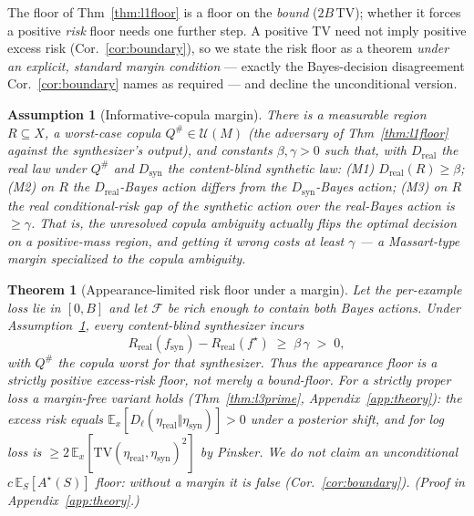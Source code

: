 \documentclass[11pt]{article}
\newtheorem{theorem}{Theorem}
\newtheorem{assumption}{Assumption}
\begin{document}
The floor of Thm~\ref{thm:l1floor} is a floor on the \emph{bound} ($2B\,\mathrm{TV}$); whether it
forces a positive \emph{risk} floor needs one further step. A positive TV need not imply positive
excess risk (Cor.~\ref{cor:boundary}), so we state the risk floor as a theorem \emph{under an
explicit, standard margin condition} --- exactly the Bayes-decision disagreement
Cor.~\ref{cor:boundary} names as required --- and decline the unconditional version.

\begin{assumption}[Informative-copula margin]\label{ass:margin}
There is a measurable region $R\subseteq X$, a worst-case copula $Q^\#\in\mathcal U(M)$ (the
adversary of Thm~\ref{thm:l1floor} against the synthesizer's output), and constants
$\beta,\gamma>0$ such that, with $D_{\mathrm{real}}$ the real law under $Q^\#$ and
$D_{\mathrm{syn}}$ the content-blind synthetic law: \emph{(M1)} $D_{\mathrm{real}}(R)\ge\beta$;
\emph{(M2)} on $R$ the $D_{\mathrm{real}}$-Bayes action differs from the $D_{\mathrm{syn}}$-Bayes
action; \emph{(M3)} on $R$ the real conditional-risk gap of the synthetic action over the
real-Bayes action is $\ge\gamma$. That is, the unresolved copula ambiguity actually flips the
optimal decision on a positive-mass region, and getting it wrong costs at least $\gamma$ --- a
Massart-type margin specialized to the copula ambiguity.
\end{assumption}

\begin{theorem}[Appearance-limited risk floor under a margin]\label{thm:l3risk}
Let the per-example loss lie in $[0,B]$ and let $\mathcal F$ be rich enough to contain both Bayes
actions. Under Assumption~\ref{ass:margin}, every content-blind synthesizer incurs
\[
R_{\mathrm{real}}(f_{\mathrm{syn}})-R_{\mathrm{real}}(f^\star)\;\ge\;\beta\,\gamma\;>\;0,
\]
with $Q^\#$ the copula worst for that synthesizer. Thus the appearance floor is a strictly
positive excess-\emph{risk} floor, not merely a bound-floor. For a strictly proper loss a
margin-free variant holds (Thm~\ref{thm:l3prime}, Appendix~\ref{app:theory}): the excess risk
equals $\mathbb{E}_x[D_\ell(\eta_{\mathrm{real}}\Vert\eta_{\mathrm{syn}})]>0$ under a posterior
shift, and for log loss is $\ge 2\,\mathbb{E}_x[\mathrm{TV}(\eta_{\mathrm{real}},\eta_{\mathrm{syn}})^2]$
by Pinsker. We do \emph{not} claim an unconditional $c\,\mathbb{E}_S[A^\star(S)]$ floor: without a
margin it is false (Cor.~\ref{cor:boundary}). (Proof in Appendix~\ref{app:theory}.)
\end{theorem}
\end{document}
